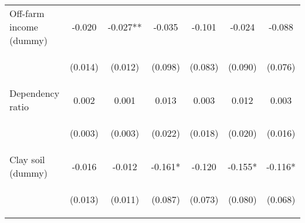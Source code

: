 \begin{center}
\begin{tabular}{lcccccc}
Off-farm income (dummy) & -0.020 & -0.027** & -0.035 & -0.101 & -0.024 & -0.088 \\
\vspace{4pt} & \begin{footnotesize}(0.014)\end{footnotesize} & \begin{footnotesize}(0.012)\end{footnotesize} & \begin{footnotesize}(0.098)\end{footnotesize} & \begin{footnotesize}(0.083)\end{footnotesize} & \begin{footnotesize}(0.090)\end{footnotesize} & \begin{footnotesize}(0.076)\end{footnotesize} \\
Dependency ratio & 0.002 & 0.001 & 0.013 & 0.003 & 0.012 & 0.003 \\
\vspace{4pt} & \begin{footnotesize}(0.003)\end{footnotesize} & \begin{footnotesize}(0.003)\end{footnotesize} & \begin{footnotesize}(0.022)\end{footnotesize} & \begin{footnotesize}(0.018)\end{footnotesize} & \begin{footnotesize}(0.020)\end{footnotesize} & \begin{footnotesize}(0.016)\end{footnotesize} \\
Clay soil (dummy) & -0.016 & -0.012 & -0.161* & -0.120 & -0.155* & -0.116* \\
\vspace{4pt} & \begin{footnotesize}(0.013)\end{footnotesize} & \begin{footnotesize}(0.011)\end{footnotesize} & \begin{footnotesize}(0.087)\end{footnotesize} & \begin{footnotesize}(0.073)\end{footnotesize} & \begin{footnotesize}(0.080)\end{footnotesize} & \begin{footnotesize}(0.068)\end{footnotesize} \\

\end{tabular}
\end{center}
